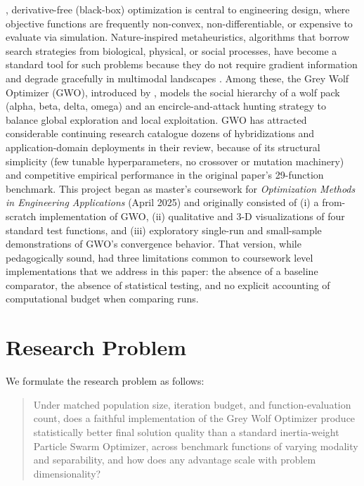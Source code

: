 \documentclass[journal]{IEEEtran}
\begin{document}
, derivative-free (black-box) optimization is central to engineering design, where objective functions are frequently non-convex, non-differentiable, or expensive to evaluate via simulation. Nature-inspired metaheuristics, algorithms that borrow search strategies from biological, physical, or social processes, have become a standard tool for such problems because they do not require gradient information and degrade gracefully in multimodal landscapes \cite{yang2010}. Among these, the Grey Wolf Optimizer (GWO), introduced by \cite{mirjalili2014}, models the social hierarchy of a wolf pack (alpha, beta, delta, omega) and an encircle-and-attack hunting strategy to balance global exploration and local exploitation. GWO has attracted considerable continuing research \cite{faris2018} catalogue dozens of hybridizations and application-domain deployments in their review, because of its structural simplicity (few tunable hyperparameters, no crossover or mutation machinery) and competitive empirical performance in the original paper's 29-function benchmark. This project began as master's coursework for \textit{Optimization Methods in Engineering Applications} (April 2025) and originally consisted of (i) a from-scratch implementation of GWO, (ii) qualitative and 3-D visualizations of four standard test functions, and (iii) exploratory single-run and small-sample demonstrations of GWO's convergence behavior. That version, while pedagogically sound, had three limitations common to coursework level implementations that we address in this paper: the absence of a baseline comparator, the absence of statistical testing, and no explicit accounting of computational budget when comparing runs.

\section{Research Problem}

We formulate the research problem as follows:

\begin{quote}
Under matched population size, iteration budget, and function-evaluation count, does a faithful implementation of the Grey Wolf Optimizer produce statistically better final solution quality than a standard inertia-weight Particle Swarm Optimizer, across benchmark functions of varying modality and separability, and how does any advantage scale with problem dimensionality?
\end{quote}
\end{document}
